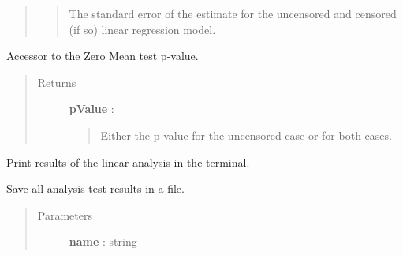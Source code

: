 \documentclass[letterpaper,10pt,english]{sphinxmanual}
\begin{document}
\begin{fulllineitems}
\begin{fulllineitems}
\begin{quote}
\begin{description}
\begin{quote}
The standard error of the estimate for the uncensored and censored
(if so) linear regression model.
\end{quote}

\end{description}\end{quote}

\end{fulllineitems}


\begin{fulllineitems}
\label{_generated/otpod.UnivariateLinearModelAnalysis:otpod.UnivariateLinearModelAnalysis.getZeroMeanPValue}
Accessor to the Zero Mean test p-value.
\begin{quote}\begin{description}
\item[{Returns}] \leavevmode
\textbf{pValue} : \href{http://doc.openturns.org/openturns-latest/sphinx/user\_manual/\_generated/openturns.NumericalPoint.html\#openturns.NumericalPoint}{}
\begin{quote}

Either the p-value for the uncensored case or for both cases.
\end{quote}

\end{description}\end{quote}

\end{fulllineitems}


\begin{fulllineitems}
\label{_generated/otpod.UnivariateLinearModelAnalysis:otpod.UnivariateLinearModelAnalysis.printResults}
Print results of the linear analysis in the terminal.

\end{fulllineitems}


\begin{fulllineitems}
\label{_generated/otpod.UnivariateLinearModelAnalysis:otpod.UnivariateLinearModelAnalysis.saveResults}
Save all analysis test results in a file.
\begin{quote}\begin{description}
\item[{Parameters}] \leavevmode
\textbf{name} : string
\begin{quote}


\end{quote}
\end{description}
\end{quote}
\end{fulllineitems}
\end{fulllineitems}
\end{document}
